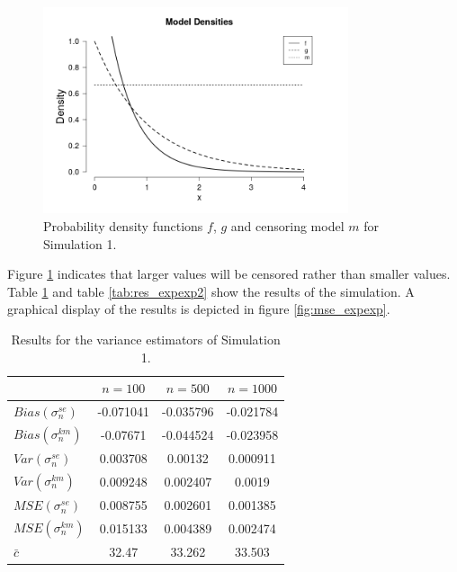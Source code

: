 \clearpage
\begin{figure}[h!]
	\begin{center}
		\includegraphics[width=0.8\textwidth]{./figures/exp_exp_dens}
	\end{center}
	\caption{Probability density functions $f$, $g$ and censoring model $m$ for Simulation 1.}
	\label{fig:dens_expexp}
\end{figure}
Figure \ref{fig:dens_expexp} indicates that larger values will be censored rather than smaller values. 
Table \ref{tab:res_expexp1} and table \ref{tab:res_expexp2} show the results of the simulation. A graphical display of the results is depicted in figure \ref{fig:mse_expexp}.
\begin{table}[h!]
	\begin{center}
		\begin{tabular}{| l || c | c | c |}
		\hline
		&       $n=100$   &    $n=500$    &    $n=1000$\\
		\hline
		\hline
		$Bias(\sigma_n^{se})$ & -0.071041 & -0.035796 & -0.021784\\
		$Bias(\sigma_n^{km})$ & -0.07671 & -0.044524 & -0.023958\\
		\hline
		$Var(\sigma_n^{se})$ & 0.003708 & 0.00132 & 0.000911\\
		$Var(\sigma_n^{km})$ & 0.009248 & 0.002407 & 0.0019\\
		\hline
		$MSE(\sigma_n^{se})$ & 0.008755 & 0.002601 & 0.001385\\
		$MSE(\sigma_n^{km})$  & 0.015133 & 0.004389 & 0.002474\\
		\hline
		\hline
		$\bar c$  & 32.47 & 33.262 & 33.503\\
		\hline
		\end{tabular}
	\end{center}
	\caption{Results for the variance estimators of Simulation 1.}
	\label{tab:res_expexp1}
\end{table}
